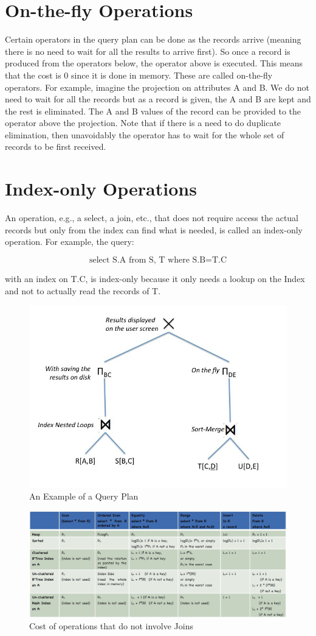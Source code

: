 \documentclass[12pt]{article}
\begin{document}
\section{On-the-fly Operations}

Certain operators in the query plan can be done as the records arrive (meaning there is no need to wait for all the results to arrive first). So once a record is produced from the operators below, the operator above is executed. This means that the cost is 0 since it is done in memory. These are called on-the-fly operators. For example, imagine the projection on attributes A and B. We do not need to wait for all the records but as a record is given, the A and B are kept and the rest is eliminated. The A and B values of the record can be provided to the operator above the projection.
Note that if there is a need to do duplicate elimination, then unavoidably the operator has to wait for the whole set of records to be first received.

\section{Index-only Operations}

An operation, e.g., a select, a join, etc., that does not require access the actual records but only from the index can find what is needed, is called an index-only operation. For example, the query: 

$$\text{select S.A from S, T where S.B=T.C}$$

with an index on T.C, is index-only because it only needs a lookup on the Index and not to actually read the records of T.

\begin{figure}[h]
\includegraphics[scale=0.5]{img1.jpg}
\centering
\caption{An Example of a Query Plan}
\end{figure}

\begin{figure}[h]
\includegraphics[scale=0.47]{img2.jpg}
\centering
\caption{Cost of operations that do not involve Joins}
\end{figure}
\end{document}
